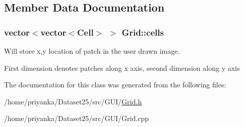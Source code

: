 \subsection{\-Member \-Data \-Documentation}
\hypertarget{classGrid_ade574c0d539d2b33b1cb57f6fd47dd2f}{
\subsubsection[{cells}]{\setlength{\rightskip}{0pt plus 5cm}vector$<$vector$<${\bf \-Cell}$>$ $>$ {\bf \-Grid\-::cells}}}\label{classGrid_ade574c0d539d2b33b1cb57f6fd47dd2f}


\-Will store x,y location of patch in the user drawn image. 

\-First dimension denotes patches along x axis, second dimension along y axis 

\-The documentation for this class was generated from the following files\-:\begin{DoxyCompactItemize}
\item 
/home/priyanka/\-Dataset25/src/\-G\-U\-I/\hyperlink{Grid_8h}{\-Grid.\-h}\item 
/home/priyanka/\-Dataset25/src/\-G\-U\-I/\-Grid.\-cpp\end{DoxyCompactItemize}
